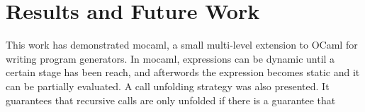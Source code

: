 
\section{Results and Future Work}
This work has demonstrated mocaml, a small multi-level extension to OCaml for writing program generators. In mocaml, expressions can be dynamic until a certain stage has been reach, and afterwords the expression becomes static and it can be partially evaluated. A call unfolding strategy was also presented. It guarantees that recursive calls are only unfolded if there is a guarantee that

